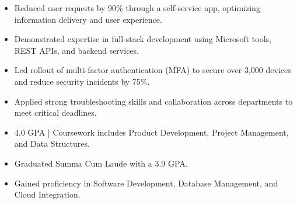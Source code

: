 \par\smallskip
\noindent
\begin{minipage}{20cm}
  \begin{minipage}{9.75cm}
    \begin{itemize}
      \item Reduced user requests by 90\% through a self-service app, optimizing information delivery and user experience.
      \item Demonstrated expertise in full-stack development using Microsoft tools, REST APIs, and backend services.
    \end{itemize}
  \end{minipage}
  \hfill
  \begin{minipage}{9.75cm}
    \begin{itemize}
      \item Led rollout of multi-factor authentication (MFA) to secure over 3,000 devices and reduce security incidents by 75\%.
      \item Applied strong troubleshooting skills and collaboration across departments to meet critical deadlines.
    \end{itemize}
  \end{minipage}
\end{minipage}
\par\smallskip
\divider

\begin{itemize}
  \item 4.0 GPA | Coursework includes Product Development, Project Management, and Data Structures.
\end{itemize}
\divider

\begin{itemize}
  \item Graduated Summa Cum Laude with a 3.9 GPA.
  \item Gained proficiency in Software Development, Database Management, and Cloud Integration.
\end{itemize}

\noindent
\begin{minipage}{20cm}
\end{minipage}


